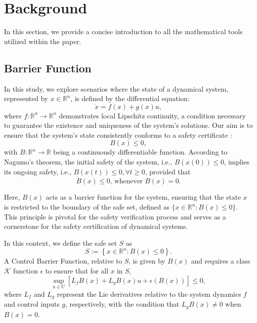 \section{Background}
\label{sec:Background}


In this section, we provide a concise introduction to all the mathematical tools utilized within the paper. 



\subsection{Barrier Function}
\label{subsec:barrier}

In this study, we explore scenarios where the state of a dynamical system, represented by \(x \in \mathbb{R}^n\), is defined by the differential equation:
\begin{equation*}
	\dot{x} = f(x) + g(x)u,
\end{equation*}
where \(f: \mathbb{R}^n \to \mathbb{R}^n\) demonstrates local Lipschitz continuity, a condition necessary to guarantee the existence and uniqueness of the system's solutions. Our aim is to ensure that the system's state consistently conforms to a safety certificate \cite{belta}:
\begin{equation*}
	B(x) \leq 0,
\end{equation*}
with \(B: \mathbb{R}^n \to \mathbb{R}\) being a continuously differentiable function. According to Nagumo's theorem, the initial safety of the system, i.e., \(B(x(0)) \leq 0\), implies its ongoing safety, i.e., \(B(x(t)) \leq 0, \forall t \geq 0\), provided that
\begin{equation}
	\dot{B}(x) \leq 0 \text{, whenever } B(x) = 0.
\end{equation}

Here, \(B(x)\) acts as a barrier function for the system, ensuring that the state \(x\) is restricted to the boundary of the safe set, defined as \(\{x \in \mathbb{R}^n : B(x) \leq 0\}\). This principle is pivotal for the safety verification process and serves as a cornerstone for the safety certification of dynamical systems.

In this context, we define the safe set \(S\) as
\[ S := \left\{ x \in \mathbb{R}^n : B(x) \leq 0 \right\}. \]
A Control Barrier Function, relative to \(S\), is given by \(B(x)\) and requires a class \(\mathcal{K}\) function \(\epsilon\) to ensure that for all \(x\) in \(S\),
\begin{equation}
	\sup_{{u} \in U} \left[ L_f B(x) + L_g B(x) u + \epsilon(B(x)) \right] \leq 0, 
\end{equation}
where \(L_f\) and \(L_g\) represent the Lie derivatives relative to the system dynamics \(f\) and control inputs \(g\), respectively, with the condition that \(L_g B(x) \neq 0\) when \(B(x) = 0\).




